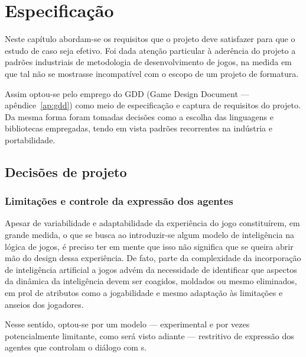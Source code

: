 \chapter{Especificação}


Neste capítulo abordam-se os requisitos que o projeto deve satisfazer para que o estudo de caso seja efetivo. Foi dada atenção particular à aderência do projeto a padrões industriais de metodologia de desenvolvimento de jogos, na medida em que tal não se mostrasse incompatível com o escopo de um projeto de formatura. 

Assim optou-se pelo emprego do GDD (Game Design Document --- apêndice~\ref{ap:gdd}) como meio de especificação e captura de requisitos do projeto. Da mesma forma foram tomadas decisões como a escolha das linguagens e bibliotecas empregadas, tendo em vista padrões recorrentes na indústria e portabilidade.

\section{Decisões de projeto}

\subsection{Limitações e controle da expressão dos agentes}

Apesar de variabilidade e adaptabilidade da experiência do jogo
constituírem, em grande medida, o que se busca ao introduzir-se algum
modelo de inteligência na lógica de jogos, é preciso ter em mente que
isso não significa que se queira abrir mão do design dessa
experiência. De fato, parte da complexidade da incorporação de
inteligência artificial a jogos advém da necessidade de identificar
que aspectos da dinâmica da inteligência devem ser coagidos, moldados
ou mesmo eliminados, em prol de atributos como a jogabilidade e mesmo
adaptação às limitações e anseios dos jogadores.

Nesse sentido, optou-se por um modelo --- experimental e
por vezes potencialmente limitante, como será visto adiante ---
restritivo de expressão dos agentes que controlam o diálogo com
\npc{}s.

